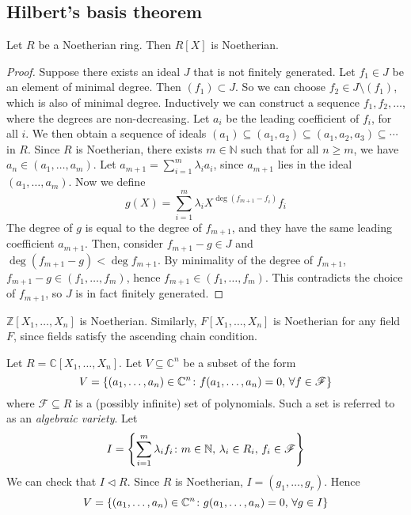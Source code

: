 \subsection{Hilbert's basis theorem}
\begin{theorem}
	Let \( R \) be a Noetherian ring.
	Then \( R[X] \) is Noetherian.
\end{theorem}
\begin{proof}
	Suppose there exists an ideal \( J \) that is not finitely generated.
	Let \( f_1 \in J \) be an element of minimal degree.
	Then \( (f_1) \subset J \).
	So we can choose \( f_2 \in J \setminus (f_1) \), which is also of minimal degree.
	Inductively we can construct a sequence \( f_1, f_2, \dots \), where the degrees are non-decreasing.
	Let \( a_i \) be the leading coefficient of \( f_i \), for all \( i \).
	We then obtain a sequence of ideals \( (a_1) \subseteq (a_1, a_2) \subseteq (a_1, a_2, a_3) \subseteq \cdots \) in \( R \).
	Since \( R \) is Noetherian, there exists \( m \in \mathbb N \) such that for all \( n \geq m \), we have \( a_{n} \in (a_1, \dots, a_m) \).
	Let \( a_{m+1} = \sum_{i=1}^m \lambda_i a_i \), since \( a_{m+1} \) lies in the ideal \( (a_1, \dots, a_m) \).
	Now we define
	\[
		g(X) = \sum_{i=1}^m \lambda_i X^{\deg (f_{m+1} - f_i)} f_i
	\]
	The degree of \( g \) is equal to the degree of \( f_{m+1} \), and they have the same leading coefficient \( a_{m+1} \).
	Then, consider \( f_{m+1} - g \in J \) and \( \deg (f_{m+1} - g) < \deg f_{m+1} \).
	By minimality of the degree of \( f_{m+1} \), \( f_{m+1} - g \in (f_1, \dots, f_m) \), hence \( f_{m+1} \in (f_1, \dots, f_m) \).
	This contradicts the choice of \( f_{m+1} \), so \( J \) is in fact finitely generated.
\end{proof}
\begin{corollary}
	\( \mathbb Z[X_1, \dots, X_n] \) is Noetherian.
	Similarly, \( F[X_1, \dots, X_n] \) is Noetherian for any field \( F \), since fields satisfy the ascending chain condition.
\end{corollary}
\begin{example}
	Let \( R = \mathbb C[X_1, \dots, X_n] \).
	Let \( V \subseteq \mathbb C^n \) be a subset of the form
	\[
		V = \qty{(a_1, \dots, a_n) \in \mathbb C^n \colon f(a_1, \dots, a_n) = 0,\,\forall f \in \mathscr F}
	\]
	where \( \mathscr F \subseteq R \) is a (possibly infinite) set of polynomials.
	Such a set is referred to as an \textit{algebraic variety}.
	Let
	\[
		I = \qty{\sum_{i=1}^m \lambda_i f_i \colon m \in \mathbb N,\, \lambda_i \in R_i,\, f_i \in \mathscr F}
	\]
	We can check that \( I \vartriangleleft R \).
	Since \( R \) is Noetherian, \( I = (g_1, \dots, g_r) \).
	Hence
	\[
		V = \qty{(a_1, \dots, a_n) \in \mathbb C^n \colon g(a_1, \dots, a_n) = 0,\,\forall g \in I}
	\]
\end{example}
